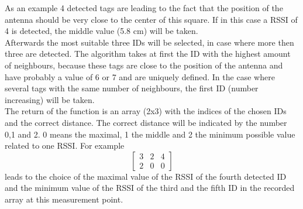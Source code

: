 As an example 4 detected tags are leading to the fact that the position of the antenna should be very close to the center of this square. If in this case a RSSI of 4 is detected, the middle value (5.8 cm) will be taken. \\
Afterwards the most suitable three IDs will be selected, in case where more then three are detected. The algorithm takes at first the ID with the highest amount of neighbours, because these tags are close to the position of the antenna and have probably a value of 6 or 7 and are uniquely defined. In the case where several tags with the same number of neighbours, the first ID (number increasing) will be taken. \\
The return of the function is an array (2x3) with the indices of the chosen IDs and the correct distance. The correct distance will be indicated by the number 0,1 and 2. 0 means the maximal, 1 the middle and 2 the minimum possible value related to one RSSI. For example 
\[
\begin{bmatrix}
    3 & 2 & 4\\
    2 & 0 & 0 
\end{bmatrix} 
\]
leads to the choice of the maximal value of the RSSI of the fourth detected ID and the minimum value of the RSSI of the third and the fifth ID in the recorded array at this measurement point. \\


